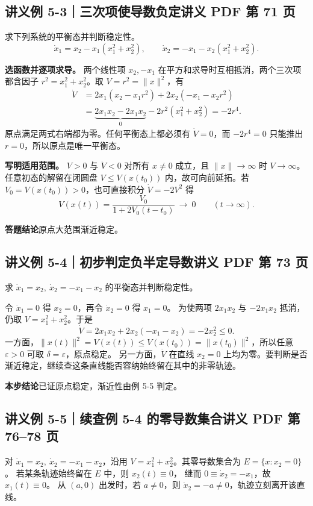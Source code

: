 \documentclass[UTF8,a4paper,11pt,fontset=fandol]{ctexart}
\begin{document}
\subsection*{讲义例 5-3｜三次项使导数负定\hfill{\normalfont\small 讲义 PDF 第 71 页}}
求下列系统的平衡态并判断稳定性。
\[
  \dot x_1=x_2-x_1(x_1^2+x_2^2),\qquad
  \dot x_2=-x_1-x_2(x_1^2+x_2^2).
\]

\textbf{选函数并逐项求导。}
两个线性项 $x_2,-x_1$ 在平方和求导时互相抵消，两个三次项都含因子 $r^2=x_1^2+x_2^2$。取 $V=r^2=\lVert x\rVert^2$，有
\[
\begin{aligned}
 \dot V
 &=2x_1(x_2-x_1r^2)+2x_2(-x_1-x_2r^2)\\
 &=\underbrace{2x_1x_2-2x_1x_2}_{0}
       -2r^2(x_1^2+x_2^2)
 =-2r^4 .
\end{aligned}
\]
原点满足两式右端都为零。任何平衡态上都必须有 $\dot V=0$，而 $-2r^4=0$ 只能推出 $r=0$，所以原点是唯一平衡态。

\textbf{写明适用范围。}
$V>0$ 与 $\dot V<0$ 对所有 $x\ne0$ 成立，且 $\lVert x\rVert\to\infty$ 时 $V\to\infty$。
任意初态的解留在闭圆盘 $V\le V(x(t_0))$ 内，故可向前延拓。若 $V_0=V(x(t_0))>0$，也可直接积分 $\dot V=-2V^2$ 得
\[
 V(x(t))=\frac{V_0}{1+2V_0(t-t_0)}\ \longrightarrow\ 0
 \qquad (t\to\infty).
\]

\textbf{答题结论}\quad 原点大范围渐近稳定。

\subsection*{讲义例 5-4｜初步判定负半定导数\hfill{\normalfont\small 讲义 PDF 第 73 页}}
求 $\dot x_1=x_2,\ \dot x_2=-x_1-x_2$ 的平衡态并判断稳定性。

令 $\dot x_1=0$ 得 $x_2=0$，再令 $\dot x_2=0$ 得 $x_1=0$。
为使两项 $2x_1x_2$ 与 $-2x_1x_2$ 抵消，仍取 $V=x_1^2+x_2^2$。于是
\[
  \dot V=2x_1x_2+2x_2(-x_1-x_2)=-2x_2^2\le0 .
\]
一方面，$\lVert x(t)\rVert^2=V(x(t))\le V(x(t_0))=\lVert x(t_0)\rVert^2$，所以任意 $\varepsilon>0$ 可取 $\delta=\varepsilon$，原点稳定。
另一方面，$\dot V$ 在直线 $x_2=0$ 上均为零。要判断是否渐近稳定，继续查这条直线能否容纳始终留在其中的非零轨迹。

\textbf{本步结论}\quad 已证原点稳定，渐近性由例 5-5 判定。

\newpage
\subsection*{讲义例 5-5｜续查例 5-4 的零导数集合\hfill{\normalfont\small 讲义 PDF 第 76--78 页}}
对 $\dot x_1=x_2,\ \dot x_2=-x_1-x_2$，沿用 $V=x_1^2+x_2^2$。其零导数集合为 $E=\{x:x_2=0\}$。
若某条轨迹始终留在 $E$ 中，则 $x_2(t)\equiv0$，
继而 $0\equiv\dot x_2=-x_1$，故 $x_1(t)\equiv0$。
从 $(a,0)$ 出发时，若 $a\ne0$，则 $\dot x_2=-a\ne0$，轨迹立刻离开该直线。
\end{document}
